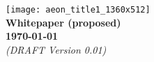 
\newcommand{\titlesize}{\fontsize{32pt}{20pt}\selectfont}

\begin{titlepage}
	\vspace*{48pt}
	\centering
	\texttt{[image: aeon\_title1\_1360x512]}
	\\
	\vspace{80pt}
	{\titlesize \textbf{Whitepaper (proposed)}}
	\\
	\vspace{36pt}
	\textbf{\today}
	\\
	\vspace{18pt}
	{\small\em (DRAFT Version 0.01)}

\end{titlepage}